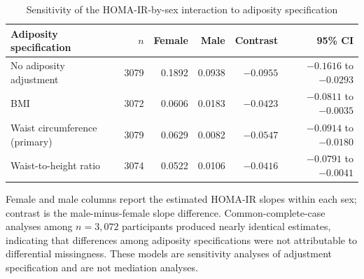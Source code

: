 \documentclass[11pt]{article}
\begin{document}
\begin{table}[htbp]
\centering
\caption{Sensitivity of the HOMA-IR-by-sex interaction to adiposity specification}
\label{tab:s2_adiposity}
\begin{threeparttable}
\small
\begin{tabular}{lrrrrr}
\toprule
Adiposity specification & $n$ & Female & Male &
Contrast & 95\% CI \\
\midrule
No adiposity adjustment & 3079 & 0.1892 & 0.0938 & $-0.0955$ & $-0.1616$ to $-0.0293$ \\
BMI & 3072 & 0.0606 & 0.0183 & $-0.0423$ & $-0.0811$ to $-0.0035$ \\
Waist circumference (primary) & 3079 & 0.0629 & 0.0082 & $-0.0547$ & $-0.0914$ to $-0.0180$ \\
Waist-to-height ratio & 3074 & 0.0522 & 0.0106 & $-0.0416$ & $-0.0791$ to $-0.0041$ \\
\bottomrule
\end{tabular}
\begin{tablenotes}[flushleft]
\footnotesize
\item Female and male columns report the estimated HOMA-IR slopes within
each sex; contrast is the male-minus-female slope difference.
Common-complete-case analyses among $n=3,072$ participants produced nearly
identical estimates, indicating that differences among adiposity specifications
were not attributable to differential missingness. These models are sensitivity
analyses of adjustment specification and are not mediation analyses.
\end{tablenotes}
\end{threeparttable}
\end{table}
\end{document}
